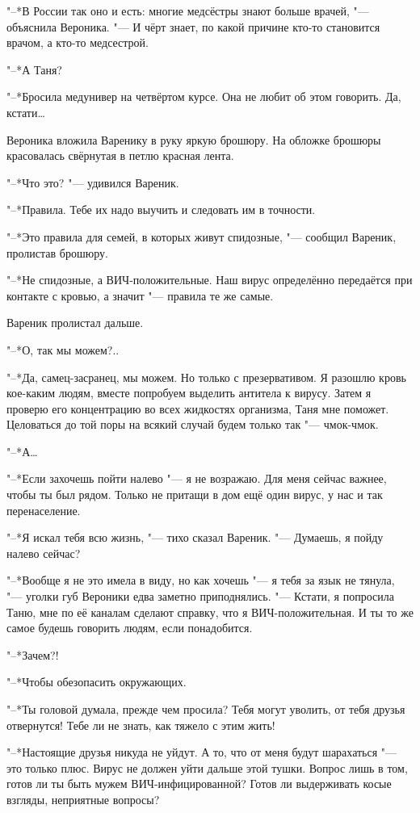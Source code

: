 "--*В России так оно и есть: многие медсёстры знают больше врачей, "--- объяснила Вероника.
"--- И чёрт знает, по какой причине кто-то становится врачом, а кто-то медсестрой.

"--*А Таня?

"--*Бросила медунивер на четвёртом курсе.
Она не любит об этом говорить.
Да, кстати\ldots{}

Вероника вложила Варенику в руку яркую брошюру.
На обложке брошюры красовалась свёрнутая в петлю красная лента.

"--*Что это? "--- удивился Вареник.

"--*Правила.
Тебе их надо выучить и следовать им в точности.

"--*Это правила для семей, в которых живут спидозные, "--- сообщил Вареник, пролистав брошюру.

"--*Не спидозные, а ВИЧ-положительные.
Наш вирус определённо передаётся при контакте с кровью, а значит "--- правила те же самые.

Вареник пролистал дальше.

"--*О, так мы можем?..

"--*Да, самец-засранец, мы можем.
Но только с презервативом.
Я разошлю кровь кое-каким людям, вместе попробуем выделить антитела к вирусу.
Затем я проверю его концентрацию во всех жидкостях организма, Таня мне поможет.
Целоваться до той поры на всякий случай будем только так "--- чмок-чмок.

"--*А\ldots{}

"--*Если захочешь пойти налево "--- я не возражаю.
Для меня сейчас важнее, чтобы ты был рядом.
Только не притащи в дом ещё один вирус, у нас и так перенаселение.

"--*Я искал тебя всю жизнь, "--- тихо сказал Вареник.
"--- Думаешь, я пойду налево сейчас?

"--*Вообще я не это имела в виду, но как хочешь "--- я тебя за язык не тянула, "--- уголки губ Вероники едва заметно приподнялись.
"--- Кстати, я попросила Таню, мне по её каналам сделают справку, что я ВИЧ-положительная.
И ты то же самое будешь говорить людям, если понадобится.

"--*Зачем?!

"--*Чтобы обезопасить окружающих.

"--*Ты головой думала, прежде чем просила?
Тебя могут уволить, от тебя друзья отвернутся!
Тебе ли не знать, как тяжело с этим жить!

"--*Настоящие друзья никуда не уйдут.
А то, что от меня будут шарахаться "--- это только плюс.
Вирус не должен уйти дальше этой тушки.
Вопрос лишь в том, готов ли ты быть мужем ВИЧ-инфицированной?
Готов ли выдерживать косые взгляды, неприятные вопросы?

